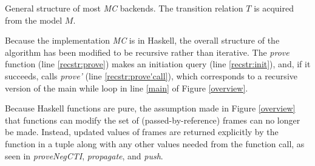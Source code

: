\documentclass[12pt,a4paper,twoside,openright]{report}
\begin{document}
{{
\begin{algorithm}[t]
\DontPrintSemicolon
{}
\caption{General structure of most \emph{MC} backends. The transition relation $T$ is acquired
from the model $M$.}
\label{recstr}
\end{algorithm}

Because the implementation \emph{MC} is in Haskell, the overall
structure of the algorithm has been modified to be recursive rather than iterative.
The {\it prove} function (line \ref{recstr:prove}) makes an initiation query
(line \ref{recstr:init}), and, if it succeeds, calls
{\it prove'} (line \ref{recstr:prove'call}),
which corresponds to a recursive version of the main while loop
in line \ref{main} of Figure \ref{overview}.

Because Haskell functions are pure, the assumption made in Figure \ref{overview}
that functions can modify the set of (passed-by-reference) frames can no longer be made.
Instead, updated values of frames are returned explicitly by the function in
a tuple along with any other values needed from the function call, as seen in
{\it proveNegCTI}, {\it propagate}, and {\it push}.

}}
\end{document}
